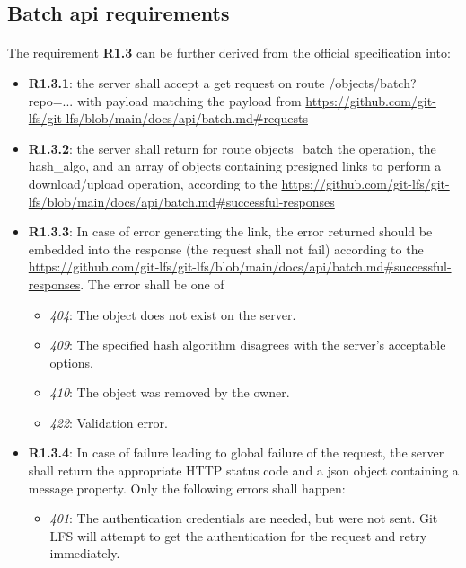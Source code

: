 \subsection{Batch api requirements}

\paragraph{}

The requirement \textbf{R1.3} can be further derived from the official specification into:

\begin{itemize}
    \item \textbf{R1.3.1}: the server shall accept a get request on route /objects/batch?repo=... with payload matching the payload from \url{https://github.com/git-lfs/git-lfs/blob/main/docs/api/batch.md#requests}
    \item \textbf{R1.3.2}: the server shall return for route objects\_batch the operation, the hash\_algo, and an array of objects containing presigned links to perform a download/upload operation, according to the \url{https://github.com/git-lfs/git-lfs/blob/main/docs/api/batch.md#successful-responses}
    \item \textbf{R1.3.3}: In case of error generating the link, the error returned should be embedded into the response (the request shall not fail) according to the \url{https://github.com/git-lfs/git-lfs/blob/main/docs/api/batch.md#successful-responses}. The error shall be one of
          \begin{itemize}
              \item \textit{404}: The object does not exist on the server.
              \item \textit{409}: The specified hash algorithm disagrees with the server's acceptable options.
              \item \textit{410}: The object was removed by the owner.
              \item \textit{422}: Validation error.
          \end{itemize}
    \item \textbf{R1.3.4}: In case of failure leading to global failure of the request, the server shall return the appropriate HTTP status code and a json object containing a message property. Only the following errors shall happen:
          \begin{itemize}
              \item \textit{401}: The authentication credentials are needed, but were not sent. Git LFS will attempt to get the authentication for the request and retry immediately.

\end{itemize}
\end{itemize}
